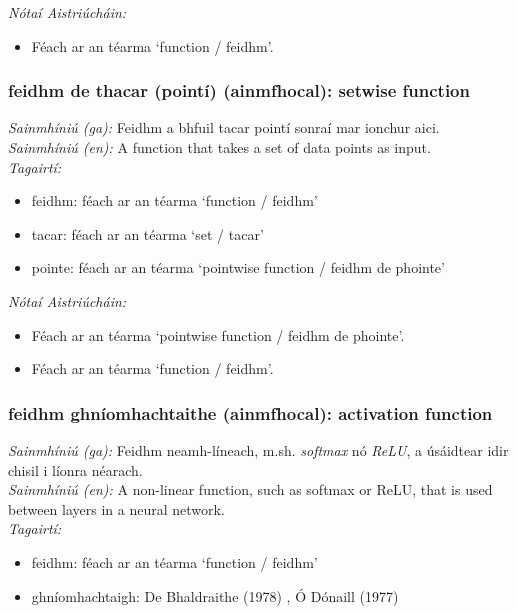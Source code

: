  \noindent \textit{Nótaí Aistriúcháin:}
\begin{itemize}
	\item Féach ar an téarma `function / feidhm'.
\end{itemize}


\subsubsection*{feidhm de thacar (pointí) (ainmfhocal): setwise function}
 \noindent \textit{Sainmhíniú (ga):} Feidhm a bhfuil tacar pointí sonraí mar ionchur aici.
\\
 \noindent \textit{Sainmhíniú (en):} A function that takes a set of data points as input.
\\
 \noindent \textit{Tagairtí:}
\begin{itemize}
	\item feidhm: féach ar an téarma `function / feidhm'
	\item tacar: féach ar an téarma `set / tacar'
	\item pointe: féach ar an téarma `pointwise function / feidhm de phointe'
\end{itemize}

 \noindent \textit{Nótaí Aistriúcháin:}
\begin{itemize}
	\item Féach ar an téarma `pointwise function / feidhm de phointe'.
	\item Féach ar an téarma `function / feidhm'.
\end{itemize}


\subsubsection*{feidhm ghníomhachtaithe (ainmfhocal): activation function}
 \noindent \textit{Sainmhíniú (ga):} Feidhm neamh-líneach, m.sh.  \noindent \textit{softmax} nó  \noindent \textit{ReLU}, a úsáidtear idir chisil i líonra néarach.
\\
 \noindent \textit{Sainmhíniú (en):} A non-linear function, such as softmax or ReLU, that is used between layers in a neural network.
\\
 \noindent \textit{Tagairtí:}
\begin{itemize}
	\item feidhm: féach ar an téarma `function / feidhm'
	\item ghníomhachtaigh: De Bhaldraithe (1978) \cite{de-bhaldraithe}, Ó Dónaill (1977) \cite{odonaill}
\end{itemize}

